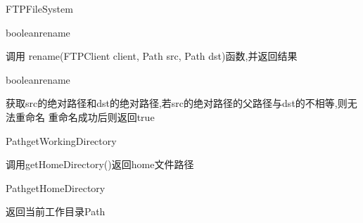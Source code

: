\begin{XeClass}{FTPFileSystem}
    \begin{XeMethod}{\XePublic}{boolean}{rename}
         
 调用 rename(FTPClient client, Path src, Path dst)函数,并返回结果

    \end{XeMethod}

    \begin{XeMethod}{\XePrivate}{boolean}{rename}
         
 获取src的绝对路径和dst的绝对路径,若src的绝对路径的父路径与dst的不相等,则无法重命名
 重命名成功后则返回true

    \end{XeMethod}

    \begin{XeMethod}{\XePublic}{Path}{getWorkingDirectory}
         
 调用getHomeDirectory()返回home文件路径

    \end{XeMethod}

    \begin{XeMethod}{\XePublic}{Path}{getHomeDirectory}
         
 返回当前工作目录Path

    \end{XeMethod}

\end{XeClass}
